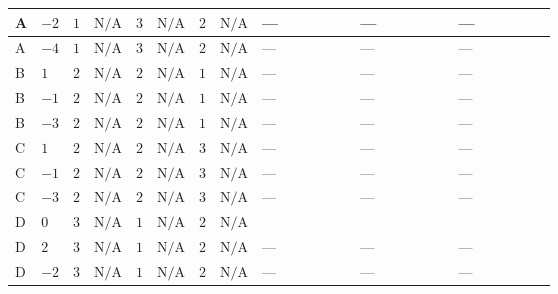 \documentclass[8pt]{article}
\begin{document}
\begin{landscape}
\begin{longtable}{@{}llcccccc >{\raggedright\arraybackslash}p{0.21\linewidth} >{\raggedright\arraybackslash}p{0.21\linewidth} >{\raggedright\arraybackslash}p{0.21\linewidth}@{}}
\midrule
A & $-2$ & $1$ & $\text{N/A}$ & $3$ & $\text{N/A}$ & $2$ & $\text{N/A}$ & --- & --- & --- \\
\midrule
A & $-4$ & $1$ & $\text{N/A}$ & $3$ & $\text{N/A}$ & $2$ & $\text{N/A}$ & --- & --- & --- \\
\midrule
B & $1$ & $2$ & $\text{N/A}$ & $2$ & $\text{N/A}$ & $1$ & $\text{N/A}$ & --- & --- & --- \\
\midrule
B & $-1$ & $2$ & $\text{N/A}$ & $2$ & $\text{N/A}$ & $1$ & $\text{N/A}$ & --- & --- & --- \\
\midrule
B & $-3$ & $2$ & $\text{N/A}$ & $2$ & $\text{N/A}$ & $1$ & $\text{N/A}$ & --- & --- & --- \\
\midrule
C & $1$ & $2$ & $\text{N/A}$ & $2$ & $\text{N/A}$ & $3$ & $\text{N/A}$ & --- & --- & --- \\
\midrule
C & $-1$ & $2$ & $\text{N/A}$ & $2$ & $\text{N/A}$ & $3$ & $\text{N/A}$ & --- & --- & --- \\
\midrule
C & $-3$ & $2$ & $\text{N/A}$ & $2$ & $\text{N/A}$ & $3$ & $\text{N/A}$ & --- & --- & --- \\
\midrule
D & $0$ & $3$ & $\text{N/A}$ & $1$ & $\text{N/A}$ & $2$ & $\text{N/A}$ & \scriptsize\adjustbox{max width=\linewidth}{$\begin{gathered} {\lambda_{X_{18}}} (6 \operatorname{Tr}\!\left({Y_d}\,\left({Y_d}\right)^{\dagger}\right)+2 \operatorname{Tr}\!\left({Y_e}\,\left({Y_e}\right)^{\dagger}\right)+6 \operatorname{Tr}\!\left({Y_u}\,\left({Y_u}\right)^{\dagger}\right))\end{gathered}$} & \scriptsize\adjustbox{max width=\linewidth}{$\begin{gathered} +4 \left({\lambda_5}\right)^{*} \left({\lambda_{X_{14}}}\right)^{*}\end{gathered}$} & \scriptsize\adjustbox{max width=\linewidth}{$\begin{gathered} +40 {\lambda_{X_{6}}} \left({\lambda_{X_{18}}}\right)^{*}\end{gathered}$} \\
\midrule
D & $2$ & $3$ & $\text{N/A}$ & $1$ & $\text{N/A}$ & $2$ & $\text{N/A}$ & --- & --- & --- \\
\midrule
D & $-2$ & $3$ & $\text{N/A}$ & $1$ & $\text{N/A}$ & $2$ & $\text{N/A}$ & --- & --- & --- \\
\midrule

\end{longtable}
\end{landscape}
\end{document}
